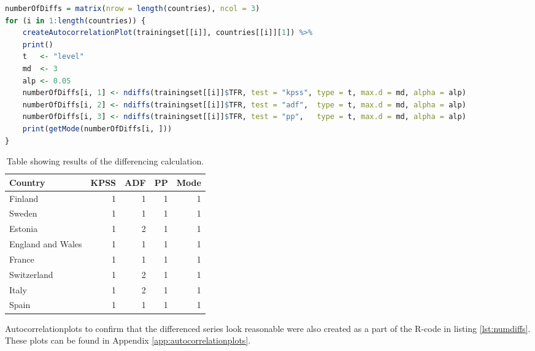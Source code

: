 \documentclass[a4paper, 12pt]{scrartcl}
\begin{document}
\begin{lstlisting}[language=R, caption={R-code for computing all suggested differences.}, label={lst:numdiffs}]
numberOfDiffs = matrix(nrow = length(countries), ncol = 3)
for (i in 1:length(countries)) {
	createAutocorrelationPlot(trainingset[[i]], countries[[i]][1]) %>%
	print()
	t   <- "level"
	md  <- 3
	alp <- 0.05
	numberOfDiffs[i, 1] <- ndiffs(trainingset[[i]]$TFR, test = "kpss", type = t, max.d = md, alpha = alp)
	numberOfDiffs[i, 2] <- ndiffs(trainingset[[i]]$TFR, test = "adf",  type = t, max.d = md, alpha = alp)
	numberOfDiffs[i, 3] <- ndiffs(trainingset[[i]]$TFR, test = "pp",   type = t, max.d = md, alpha = alp)
	print(getMode(numberOfDiffs[i, ]))
}
\end{lstlisting}
\begin{table}[b]
	\centering
	\label{tbl:numdiffs}
	\begin{tabular}{l | r r r r}
		Country & \multicolumn{1}{l}{KPSS} & \multicolumn{1}{l}{ADF} & \multicolumn{1}{l}{PP} & \multicolumn{1}{l}{Mode}\\
		\hline
		Finland		& 1 & 1 & 1 & 1\\
		Sweden 		& 1 & 1 & 1 & 1\\
		Estonia		& 1 & 2 & 1 & 1\\
		England and Wales & 1 & 1 & 1 & 1\\
		France		& 1 & 1 & 1 & 1\\
		Switzerland & 1 & 2 & 1 & 1\\
		Italy		& 1 & 2 & 1 & 1\\
		Spain		& 1 & 1 & 1 & 1
	\end{tabular}
	\caption{Table showing results of the differencing calculation.}
\end{table}

Autocorrelationplots to confirm that the differenced series look reasonable were also created as a part of the R-code in listing \ref{lst:numdiffs}.
These plots can be found in Appendix \ref{app:autocorrelationplots}.
\end{document}
